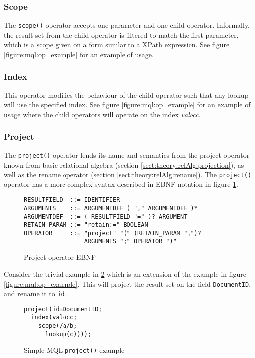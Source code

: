 \subsubsection{Scope}
\label{sect:method:marsOperators:scope}
The \texttt{scope()} operator accepts one parameter and one child operator. Informally, the
result set from the child operator is filtered to match the first parameter, which is a
scope given on a form similar to a XPath expression. See figure
\ref{figure:mql:op_example} for an example of usage. 

\subsubsection{Index}
\label{sect:method:marsOperators:index}
This operator modifies the behaviour of the child operator such that any lookup
will use the specified index. See figure \ref{figure:mql:op_example} for an
example of usage where the child operators will operate on the index
\textit{valocc}.

\subsubsection{Project}
\label{sect:method:marsOperators:project}
The \texttt{project()} operator lends its name and semantics from the project operator known from basic relational
algebra (section \ref{sect:theory:relAlg:projection}), as well as the rename operator (section
\ref{sect:theory:relAlg:rename}). The \texttt{project()} operator has a more complex syntax described in EBNF
notation in figure \ref{figure:mql:ebnf:project_ebnf}.

\begin{figure}[!h]
\centering
\begin{Verbatim}
RESULTFIELD  ::= IDENTIFIER
ARGUMENTS    ::= ARGUMENTDEF ( "," ARGUMENTDEF )*
ARGUMENTDEF  ::= ( RESULTFIELD "=" )? ARGUMENT
RETAIN_PARAM ::= "retain:=" BOOLEAN
OPERATOR     ::= "project" "(" (RETAIN_PARAM ",")? 
                 ARGUMENTS ";" OPERATOR ")"
\end{Verbatim}
\caption{Project operator EBNF}
\label{figure:mql:ebnf:project_ebnf}
\end{figure}
Consider the trivial example in \ref{figure:mql:project_example} which is an
extension of the example in figure \ref{figure:mql:op_example}. This will
project the result set on the field \texttt{DocumentID}, and rename it to
\texttt{id}. 

\begin{figure}[!h]
\centering
\begin{Verbatim}
project(id=DocumentID;
  index(valocc; 
    scope(/a/b;
      lookup(c))));
\end{Verbatim}
\caption{Simple MQL \texttt{project()} example}
\label{figure:mql:project_example}
\end{figure}

